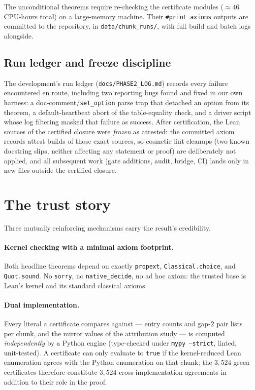 \documentclass[11pt]{article}
\theoremstyle{definition}
\theoremstyle{remark}
\newcommand{\code}[1]{\texttt{#1}}
\begin{document}
The unconditional theorems require re-checking the certificate modules
($\approx 46$ CPU-hours total) on a large-memory machine. Their
\code{\#print axioms} outputs are committed
to the repository, in \code{data/chunk\_runs/}, with full build and
batch logs alongside.

\subsection{Run ledger and freeze discipline}

The development's run ledger (\code{docs/\allowbreak PHASE2\_LOG.md}) records every
failure encountered en route, including two reporting bugs found and
fixed in our own harness: a doc-comment/\allowbreak\code{set\_option} parse trap
that detached an option from its theorem, a default-heartbeat abort of
the table-equality check, and a driver script whose log filtering masked
that failure as success. After certification, the Lean sources of the
certified closure were \emph{frozen} as attested: the committed axiom
records attest builds of those exact sources, so cosmetic lint cleanups
(two known docstring slips, neither affecting any statement or proof) are
deliberately not applied, and all subsequent work (gate additions, audit,
bridge, CI) lands only in new files outside the certified closure.

\section{The trust story}\label{sec:trust}

Three mutually reinforcing mechanisms carry the result's credibility.

\paragraph{Kernel checking with a minimal axiom footprint.}
Both headline theorems depend on exactly \code{propext},
\code{Classical.choice}, and \code{Quot.sound}. No \code{sorry}, no
\code{native\_decide}, no ad hoc axiom: the trusted base is Lean's kernel
and its standard classical axioms.

\paragraph{Dual implementation.}
Every literal a certificate compares against --- entry counts and
gap-$2$ pair lists per chunk, and the mirror values of the attribution
study --- is computed \emph{independently} by a Python engine
(type-checked under \code{mypy --strict}, linted, unit-tested). A
certificate can only evaluate to \code{true} if the kernel-reduced Lean
enumeration agrees with the Python enumeration on that chunk; the
$3{,}524$ green certificates therefore constitute $3{,}524$
cross-implementation agreements in addition to their role in the proof.
\end{document}
